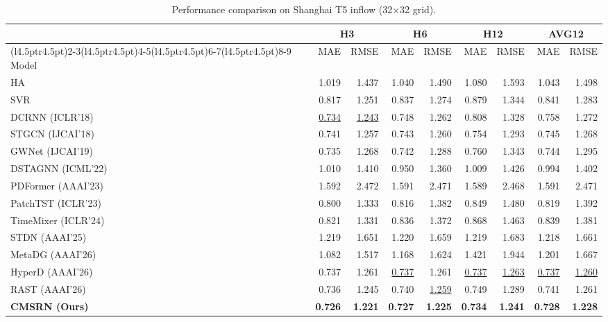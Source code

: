 \begin{table}[!t]
\centering
\caption{Performance comparison on Shanghai T5 inflow (32$\times$32 grid).}
\label{tab:shanghai-inflow}
\begingroup
\fontsize{9}{11}\selectfont
\setlength{\tabcolsep}{4.5pt}
\renewcommand{\arraystretch}{1.12}
\begin{tabular*}{\linewidth}{@{\extracolsep{\fill}}l*{8}{r}@{}}
\toprule
& \multicolumn{2}{c}{H3} & \multicolumn{2}{c}{H6} & \multicolumn{2}{c}{H12} & \multicolumn{2}{c}{AVG12} \\
\cmidrule(l{4.5pt}r{4.5pt}){2-3}\cmidrule(l{4.5pt}r{4.5pt}){4-5}\cmidrule(l{4.5pt}r{4.5pt}){6-7}\cmidrule(l{4.5pt}r{4.5pt}){8-9}
Model & MAE & RMSE & MAE & RMSE & MAE & RMSE & MAE & RMSE \\
\midrule
HA & 1.019 & 1.437 & 1.040 & 1.490 & 1.080 & 1.593 & 1.043 & 1.498 \\
SVR & 0.817 & 1.251 & 0.837 & 1.274 & 0.879 & 1.344 & 0.841 & 1.283 \\
DCRNN (ICLR'18) & \underline{0.734} & \underline{1.243} & 0.748 & 1.262 & 0.808 & 1.328 & 0.758 & 1.272 \\
STGCN (IJCAI'18) & 0.741 & 1.257 & 0.743 & 1.260 & 0.754 & 1.293 & 0.745 & 1.268 \\
GWNet (IJCAI'19) & 0.735 & 1.268 & 0.742 & 1.288 & 0.760 & 1.343 & 0.744 & 1.295 \\
DSTAGNN (ICML'22) & 1.010 & 1.410 & 0.950 & 1.360 & 1.009 & 1.426 & 0.994 & 1.402 \\
PDFormer (AAAI'23) & 1.592 & 2.472 & 1.591 & 2.471 & 1.589 & 2.468 & 1.591 & 2.471 \\
PatchTST (ICLR'23) & 0.800 & 1.333 & 0.816 & 1.382 & 0.849 & 1.480 & 0.819 & 1.392 \\
TimeMixer (ICLR'24) & 0.821 & 1.331 & 0.836 & 1.372 & 0.868 & 1.463 & 0.839 & 1.381 \\
STDN (AAAI'25) & 1.219 & 1.651 & 1.220 & 1.659 & 1.219 & 1.683 & 1.218 & 1.661 \\
MetaDG (AAAI'26) & 1.082 & 1.517 & 1.168 & 1.624 & 1.421 & 1.944 & 1.201 & 1.667 \\
HyperD (AAAI'26) & 0.737 & 1.261 & \underline{0.737} & 1.261 & \underline{0.737} & \underline{1.263} & \underline{0.737} & \underline{1.260} \\
RAST (AAAI'26) & 0.736 & 1.245 & 0.740 & \underline{1.259} & 0.749 & 1.289 & 0.741 & 1.261 \\
\midrule
\textbf{CMSRN (Ours)} & \textbf{0.726} & \textbf{1.221} & \textbf{0.727} & \textbf{1.225} & \textbf{0.734} & \textbf{1.241} & \textbf{0.728} & \textbf{1.228} \\
\bottomrule
\end{tabular*}
\endgroup
\end{table}

